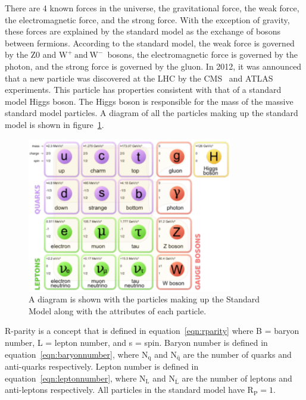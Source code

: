 There are 4 known forces in the universe, the gravitational force, the weak force, the electromagnetic force, and the strong force.
With the exception of gravity, these forces are explained by the standard model as the exchange of bosons between fermions.
According to the standard model, the weak force is governed by the Z0 and $\mathrm{W^{+}~and~W^{-}}$~bosons,
the electromagnetic force is governed by the photon, and the strong force is governed by the gluon.
In 2012, it was announced that a new particle was discovered at the LHC by the CMS~\cite{discovery} and ATLAS~\cite{higgsatlas} experiments.
This particle has properties consistent with that of a standard model Higgs boson.
The Higgs boson is responsible for the mass of the massive standard model particles.
A diagram of all the particles making up the standard model is shown in figure~\ref{fig:SM}.

\begin{figure}[!htb]
  \begin{center}
    \includegraphics[width=0.8\textwidth]{intro/figs/Standard_Model_of_Elementary_Particles.pdf}
    \caption{
      \label{fig:SM}
      A diagram is shown with the particles making up the Standard Model along with the attributes of each particle.
    }
  \end{center}
\end{figure}

R-parity is a concept that is defined in equation~\ref{eqn:rparity} where B = baryon number, L = lepton number, and s = spin. 
Baryon number is defined in equation~\ref{eqn:baryonnumber},
where $\mathrm{N_{q}}$ and $\mathrm{N_{\bar{q}}}$ are the number of quarks and anti-quarks respectively.
Lepton number is defined in equation~\ref{eqn:leptonnumber},
where $\mathrm{N_{L}}$ and $\mathrm{N_{\bar{L}}}$ are the number of leptons and anti-leptons respectively.
All particles in the standard model have $\mathrm{R_{P}} = 1$.

